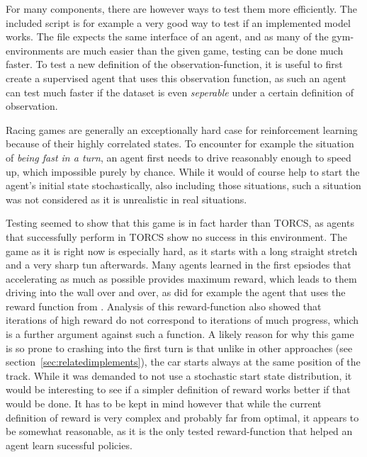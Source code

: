 For many components, there are however ways to test them more efficiently. The included  script is for example a very good way to test if an implemented model works. The file expects the same interface of an agent, and as many of the gym-environments are much easier than the given game, testing can be done much faster. To test a new definition of the observation-function, it is useful to first create a supervised agent that uses this observation function, as such an agent can test much faster if the dataset is even \textit{seperable} under a certain definition of observation.

Racing games are generally an exceptionally hard case for reinforcement learning because of their highly correlated states. To encounter for example the situation of \textit{being fast in a turn}, an agent first needs to drive reasonably enough to speed up, which impossible purely by chance. While it would of course help to start the agent's initial state stochastically, also including those situations, such a situation was not considered as it is unrealistic in real situations.

Testing seemed to show that this game is in fact harder than TORCS, as agents that successfully perform in TORCS show no success in this environment. The game as it is right now is especially hard, as it starts with a long straight stretch and a very sharp tun afterwards. Many agents learned in the first epsiodes that accelerating as much as possible provides maximum reward, which leads to them driving into the wall over and over, as did for example the agent that uses the reward function from \cite{lillicrap_continuous_2015}. Analysis of this reward-function also showed that iterations of high reward do not correspond to iterations of much progress, which is a further argument against such a function. A likely reason for why this game is so prone to crashing into the first turn is that unlike in other approaches (see section~\ref{sec:relatedimplements}), the car starts always at the same position of the track. While it was demanded to not use a stochastic start state distribution, it would be interesting to see if a simpler definition of reward works better if that would be done. It has to be kept in mind however that while the current definition of reward is very complex and probably far from optimal, it appears to be somewhat reasonable, as it is the only tested reward-function that helped an agent learn sucessful policies.

